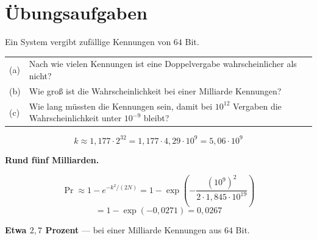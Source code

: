 \section{Übungsaufgaben}

\begin{aufgabe}
Ein System vergibt zufällige Kennungen von $64$ Bit.
\begin{center}
{\small
\renewcommand{\arraystretch}{1.4}
\begin{tabular}{@{}P{0.8cm}P{7.6cm}@{}}
\toprule
(a) & Nach wie vielen Kennungen ist eine Doppelvergabe wahrscheinlicher als nicht?\\
(b) & Wie groß ist die Wahrscheinlichkeit bei einer Milliarde Kennungen?\\
(c) & Wie lang müssten die Kennungen sein, damit bei $10^{12}$ Vergaben die Wahrscheinlichkeit unter $10^{-9}$ bleibt?\\
\bottomrule
\end{tabular}}
\end{center}

\loesung
{}
\[ k \approx 1{,}177\cdot2^{32} = 1{,}177\cdot4{,}29\cdot10^{9} = 5{,}06\cdot10^{9} \]

\begin{center}
\begin{minipage}{0.9\textwidth}
\textbf{Rund fünf Milliarden.}
\end{minipage}
\end{center}

\[ \Pr \approx 1-e^{-k^{2}/(2N)} = 1-\exp\left(-\frac{(10^{9})^{2}}{2\cdot1{,}845\cdot10^{19}}\right) \]
\[ = 1-\exp(-0{,}0271) = 0{,}0267 \]

\begin{center}
\begin{minipage}{0.9\textwidth}
\textbf{Etwa $2{,}7$ Prozent} --- bei einer Milliarde Kennungen aus $64$ Bit.
\end{minipage}
\end{center}

\begin{center}
\begin{minipage}{0.86\textwidth}
\end{minipage}
\end{center}


\end{aufgabe}
